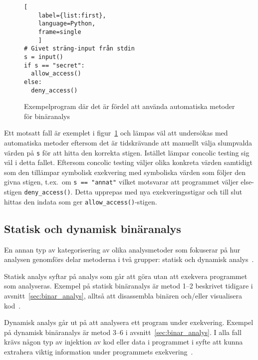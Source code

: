 \begin{figure}
    \begin{lstlisting}[
    label={list:first},
    language=Python,
    frame=single
    ]
# Givet sträng-input från stdin
s = input()
if s == "secret":
  allow_access()
else:
  deny_access()
\end{lstlisting}
    \caption{Exempelprogram där det är fördel att använda automatiska metoder för binäranalys}
    \label{fig:automatic_method_example}
\end{figure}

Ett motsatt fall är exemplet i figur~\ref{fig:automatic_method_example} och
lämpas väl att undersökas med automatiska metoder eftersom det är tidskrävande
att manuellt välja slumpvalda värden på \texttt{s} för att hitta den korrekta
stigen. Istället lämpar concolic testing sig väl i detta fallet. Eftersom
concolic testing väljer olika konkreta värden samtidigt som den tillämpar
symbolisk exekvering med symboliska värden som följer den givna stigen, t.ex.\
om \lstinline{s == "annat"} vilket motsvarar att programmet väljer else-stigen
\lstinline{deny_access()}. Detta upprepas med nya exekveringsstigar och till slut
hittas den indata som ger \lstinline{allow_access()}-stigen.


\subsection{Statisk och dynamisk binäranalys}
En annan typ av kategorisering av olika analysmetoder som fokuserar på hur
analysen genomförs delar metoderna i två grupper: statisk och dynamisk
analys~\cite{dynamic_bin_analysis}.

Statisk analys syftar på analys som går att göra utan att exekvera programmet
som analyseras. Exempel på statisk binäranalys är metod 1--2 beskrivet tidigare
i avsnitt~\ref{sec:binar_analys}, alltså att disassembla binären och/eller
visualisera kod~\cite{dynamic_bin_analysis}.

Dynamisk analys går ut på att analysera ett program under
exekvering. Exempel på dynamisk binäranalys är metod 3--6 i
avsnitt~\ref{sec:binar_analys}. I alla fall krävs någon typ av injektion av kod
eller data i programmet i syfte att kunna extrahera viktig information under
programmets exekvering~\cite{dynamic_bin_analysis}.
